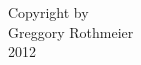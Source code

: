\thispagestyle{empty}
\begin{center}
  \vspace*{\fill}
  \begin{singlespace}
    Copyright by\\
    Greggory Rothmeier\\
    2012\\
  \end{singlespace}
  \vspace{0.5in}
\end{center}